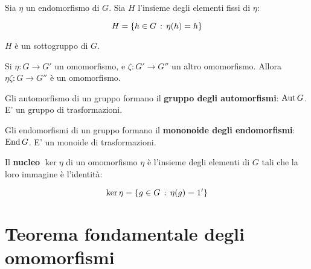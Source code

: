 \begin{corollario}
	Sia $\eta$ un endomorfismo di $G$. Sia $H$ l'insieme degli elementi fissi di $\eta$:
	
	\begin{equation}
		H = \{h \in G \,:\, \eta(h) = h\}
	\end{equation}

	$H$ è un sottogruppo di $G$.
\end{corollario}

\begin{teorema}
	Si $\eta: G \longrightarrow G'$ un omomorfismo, e $\zeta: G' \longrightarrow G''$ un altro omomorfismo. Allora $\eta\zeta: G \longrightarrow G''$ è un omomorfismo.
\end{teorema}

Gli automorfismo di un gruppo formano il \textbf{gruppo degli automorfismi}: $\operatorname{Aut} G$. E' un gruppo di trasformazioni.

Gli endomorfismi di un gruppo formano il \textbf{mononoide degli endomorfismi}: $\operatorname{End} G$. E' un monoide di trasformazioni.

Il \textbf{nucleo} $\ker \eta$ di un omomorfismo $\eta$ è l'insieme degli elementi di $G$ tali che la loro immagine è l'identità:

\begin{equation}
	\ker \eta = \{g \in G \,:\, \eta(g) = 1'\}
\end{equation}

\section{Teorema fondamentale degli omomorfismi}

